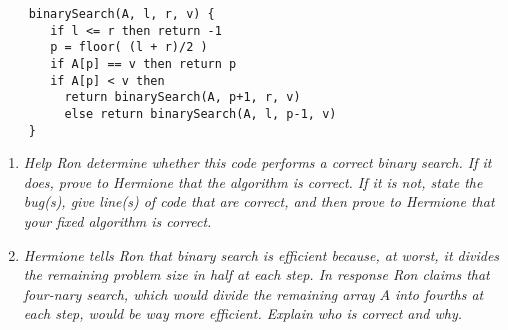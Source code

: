 \documentclass[12pt]{article}
\begin{document}
\begin{enumerate}
{\begin{small}
\begin{verbatim}
	binarySearch(A, l, r, v) {
	   if l <= r then return -1
	   p = floor( (l + r)/2 )
	   if A[p] == v then return p
	   if A[p] < v then
	     return binarySearch(A, p+1, r, v)
	     else return binarySearch(A, l, p-1, v)
	}
	\end{verbatim}
	\end{small}
}
	\begin{enumerate}
	\item \label{4a} {\itshape Help Ron determine whether this code performs a correct binary search. If it does, prove to Hermione that the algorithm is correct. If it is not, state the bug(s), give line(s) of code that are correct, and then prove to Hermione that your fixed algorithm is correct.}
	\newpage
	\phantom{} %
	\newpage
	
	
	\item \label{4b} {\itshape Hermione tells Ron that binary search is efficient because, at worst, it divides the remaining problem size in half at each step. In response Ron claims that four-nary search, which would divide the remaining array $A$ into fourths at each step, would be \textit{way more} efficient. Explain who is correct and why.}
	\pagebreak
	\end{enumerate}

	
\end{enumerate}
\end{document}
